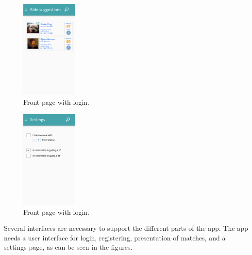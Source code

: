 \begin{figure}
	\centering
	\includegraphics[width=0.25\textwidth]{figures/GUI-main.png}
	\caption{Front page with login.}
\end{figure}

\begin{figure}
	\centering
	\includegraphics[width=0.25\textwidth]{figures/GUI-settings.png}
	\caption{Front page with login.}
\end{figure}

Several interfaces are necessary to support the different parts of the app. The app needs a user interface for login, registering, presentation of matches, and a settings page, as can be seen in the figures.